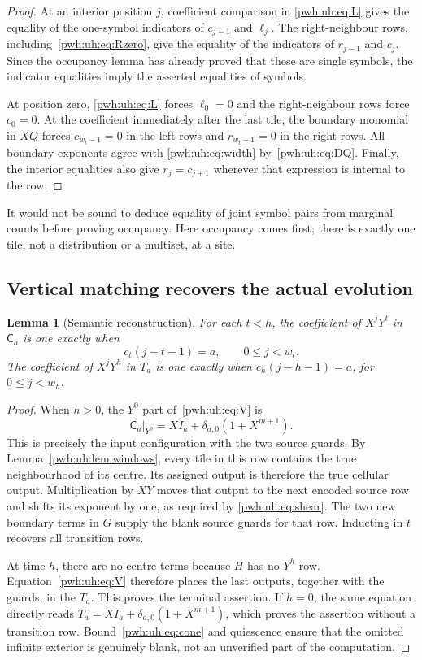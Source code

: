 \documentclass[11pt,letterpaper]{article}
\numberwithin{equation}{section}
\newtheorem{lemma}[theorem]{Lemma}
\theoremstyle{definition}
\newcommand{\CC}{\mathsf C}
\newcommand{\epsa}{\delta_{a,0}}
\begin{document}
\begin{proof}
At an interior position $j$, coefficient comparison in \eqref{pwh:uh:eq:L}
gives the equality of the one-symbol indicators of $c_{j-1}$ and
$\ell_j$. The right-neighbour rows, including~\eqref{pwh:uh:eq:Rzero}, give
the equality of the indicators of $r_{j-1}$ and $c_j$. Since the
occupancy lemma has already proved that these are single symbols, the
indicator equalities imply the asserted equalities of symbols.

At position zero, \eqref{pwh:uh:eq:L} forces $\ell_0=0$ and the right-neighbour
rows force $c_0=0$. At the coefficient immediately after the last tile,
the boundary monomial in $XQ$ forces $c_{w_t-1}=0$ in the left rows and
$r_{w_t-1}=0$ in the right rows. All boundary exponents agree with
\eqref{pwh:uh:eq:width} by~\eqref{pwh:uh:eq:DQ}. Finally, the interior equalities also
give $r_j=c_{j+1}$ wherever that expression is internal to the row.
\end{proof}

It would not be sound to deduce equality of joint symbol pairs from
marginal counts before proving occupancy. Here occupancy comes first;
there is exactly one tile, not a distribution or a multiset, at a site.

\subsection{Vertical matching recovers the actual evolution}

\begin{lemma}[Semantic reconstruction]
\label{pwh:uh:lem:reconstruct}
For each $t<h$, the coefficient of $X^jY^t$ in $\CC_a$ is one exactly
when
\[
 c_t(j-t-1)=a,\qquad 0\le j<w_t.
\]
The coefficient of $X^jY^h$ in $T_a$ is one exactly when
$c_h(j-h-1)=a$, for $0\le j<w_h$.
\end{lemma}

\begin{proof}
When $h>0$, the $Y^0$ part of~\eqref{pwh:uh:eq:V} is
\[
 \CC_a\big|_{Y^0}=XI_a+\epsa(1+X^{m+1}).
\]
This is precisely the input configuration with the two source guards.
By Lemma~\ref{pwh:uh:lem:windows}, every tile in this row contains the true
neighbourhood of its centre. Its assigned output is therefore the true
cellular output. Multiplication by $XY$ moves that output to the next
encoded source row and shifts its exponent by one, as required by
\eqref{pwh:uh:eq:shear}. The two new boundary terms in $G$ supply the blank
source guards for that row. Inducting in $t$ recovers all transition
rows.

At time $h$, there are no centre terms because $H$ has no $Y^h$ row.
Equation~\eqref{pwh:uh:eq:V} therefore places the last outputs, together with
the guards, in the $T_a$. This proves the terminal assertion. If $h=0$,
the same equation directly reads
$T_a=XI_a+\epsa(1+X^{m+1})$, which proves the assertion without a
transition row. Bound~\eqref{pwh:uh:eq:cone} and quiescence ensure that the
omitted infinite exterior is genuinely blank, not an unverified part of
the computation.
\end{proof}
\end{document}
